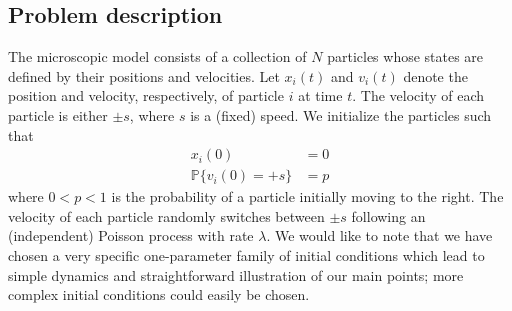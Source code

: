 \documentclass[preprint]{elsarticle}
\begin{document}



\subsection{Problem description}

The microscopic model consists of a collection of $N$ particles whose states are defined by their positions and velocities. 
%
Let $x_i(t)$ and $v_i(t)$ denote the position and velocity, respectively, of particle $i$ at time $t$.
%
The velocity of each particle is either $\pm s$, where $s$ is a (fixed) speed. 
%
We initialize the particles such that
\begin{equation}\label{eqn:system}
\begin{aligned}
x_i(0) & = 0 \\
\mathbb{P} \{ v_i(0) = +s \} & = p
\end{aligned}
\end{equation}
where $0 < p < 1$ is the probability of a particle initially moving to the right.
%
The velocity of each particle randomly switches between $\pm s$ following an (independent) Poisson process with rate $\lambda$.
%
We would like to note that we have chosen a very specific one-parameter family of initial conditions which lead to simple dynamics and straightforward illustration of our main points;
more complex initial conditions could easily be chosen. 
\end{document}
